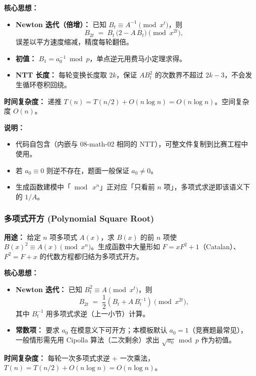 \textbf{核心思想：}
\begin{itemize}
    \item \textbf{Newton 迭代（倍增）：} 已知 $B_t \equiv A^{-1} \pmod{x^t}$，则
    \[ B_{2t} \;=\; B_t\,\bigl(2 - A\,B_t\bigr) \pmod{x^{2t}}, \]
    误差以平方速度缩减，精度每轮翻倍。
    \item \textbf{初值：} $B_1 = a_0^{-1} \bmod p$，单点逆元用费马小定理求得。
    \item \textbf{NTT 长度：} 每轮变换长度取 $2k$，保证 $A B_t^2$ 的次数界不超过 $2k-3$，不会发生循环卷积回绕。
\end{itemize}

\textbf{时间复杂度：} 递推 $T(n)=T(n/2)+O(n\log n)=O(n\log n)$。空间复杂度 $O(n)$。



\textbf{说明：}
\begin{itemize}
    \item 代码自包含（内嵌与 08-math-02 相同的 NTT），可整文件复制到比赛工程中使用。
    \item 若 $a_0 \equiv 0$ 则逆不存在，题面一般保证 $a_0 \ne 0$。
    \item 生成函数建模中「$\bmod\ x^n$」正对应「只看前 $n$ 项」，多项式求逆即该语义下的 $1/A$。
\end{itemize}

\subsubsection{多项式开方 (Polynomial Square Root)}

\textbf{用途：}  
给定 $n$ 项多项式 $A(x)$，求 $B(x)$ 的前 $n$ 项使 $B(x)^2 \equiv A(x) \pmod{x^n}$。生成函数中大量形如 $F=xF^2+1$（Catalan）、$F^2=F+x$ 的代数方程都归结为多项式开方。

\textbf{核心思想：}
\begin{itemize}
    \item \textbf{Newton 迭代：} 已知 $B_t^2 \equiv A \pmod{x^t}$，则
    \[ B_{2t} \;=\; \frac{1}{2}\left(B_t + A\,B_t^{-1}\right) \pmod{x^{2t}}, \]
    其中 $B_t^{-1}$ 用多项式求逆（上一小节）计算。
    \item \textbf{常数项：} 要求 $a_0$ 在模意义下可开方；本模板默认 $a_0=1$（竞赛题最常见），一般情形需先用 Cipolla 算法（二次剩余）求出 $\sqrt{a_0} \bmod p$ 作为初值。
\end{itemize}

\textbf{时间复杂度：} 每轮一次多项式求逆 + 一次乘法，$T(n)=T(n/2)+O(n\log n)=O(n\log n)$。

